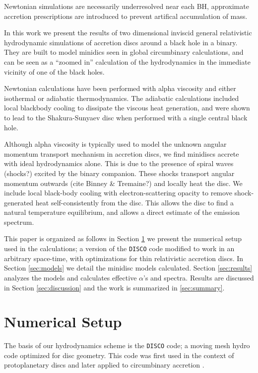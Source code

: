 \documentclass{emulateapj}
\newcommand{\DISCO}{{\texttt{DISCO}}}
\begin{document}
Newtonian simulations are necessarily underresolved near each BH, approximate accretion prescriptions are introduced to prevent artifical accumulation of mass.

In this work we present the results of two dimensional inviscid general relativistic
hydrodynamic simulations of accretion discs around a black hole in a binary.
They are built to model minidics seen in global circumbinary calculations,
and can be seen as a ``zoomed in'' calculation of the hydrodynamics in the 
immediate vicinity of one of the black holes.

Newtonian calculations have been performed with alpha viscosity and either isothermal \citep{Farris14} or adiabatic \citep{Farris15A, Farris15B} thermodynamics. The adiabatic calculations included local blackbody cooling to dissipate the
viscous heat generation, and were shown to lead to the Shakura-Sunyaev disc
when performed with a single central black hole.

Although alpha viscosity is typically used to model the unknown angular 
momentum transport mechanism in accretion discs, we find minidiscs accrete with
ideal hydrodynamics alone.  This is due to the presence of spiral waves (shocks?) excited by the binary companion. These shocks transport angular momentum outwards (cite Binney \& Tremaine?) and locally heat the disc. We include local 
black-body cooling with electron-scattering opacity to remove shock-generated
heat self-consistently from the disc.  This allows the disc to find a natural
temperature equilibrium, and allows a direct estimate of the emission spectrum.

This paper is organized as follows in Section \ref{sec:numerics} we present the
numerical setup used in the calculations; a version of the \DISCO{} code 
modified to work in an arbitrary space-time, with optimizations for thin 
relativistic accretion discs.  In Section \ref{sec:models} we detail the 
minidisc models calculated.  Section \ref{sec:results} analyzes the models and
calculates effective $\alpha$'s and spectra. Results are discussed in Section \ref{sec:discussion} and the work is summarized in \ref{sec:summary}.


\section{Numerical Setup}
\label{sec:numerics}

The basis of our hydrodynamics scheme is the \DISCO{} code; a moving mesh hydro
code optimized for disc geometry. This code was first used in the context of
protoplanetary discs \citep{Duffell12, Duffell13, Duffell14} and later applied 
to circumbinary accretion \citep{Farris14, Farris15A, Farris15B}. 
\end{document}
